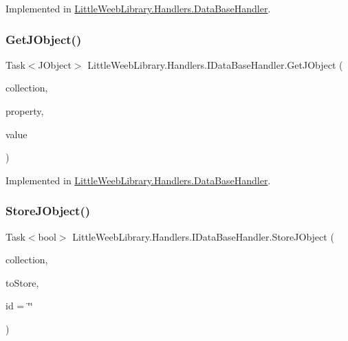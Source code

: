 Implemented in \mbox{\hyperlink{class_little_weeb_library_1_1_handlers_1_1_data_base_handler_a7f61583807f99b7838a33d2db0f7ca68}{Little\+Weeb\+Library.\+Handlers.\+Data\+Base\+Handler}}.

\mbox{\label{interface_little_weeb_library_1_1_handlers_1_1_i_data_base_handler_a9d9a8fc06ab8431daa5363becf79cf65}} 
\subsubsection{\texorpdfstring{Get\+J\+Object()}{GetJObject()}\hspace{0.1cm}{\footnotesize\ttfamily [2/2]}}
{\footnotesize\ttfamily Task$<$J\+Object$>$ Little\+Weeb\+Library.\+Handlers.\+I\+Data\+Base\+Handler.\+Get\+J\+Object (\begin{DoxyParamCaption}\item[{string}]{collection,  }\item[{string}]{property,  }\item[{string}]{value }\end{DoxyParamCaption})}



Implemented in \mbox{\hyperlink{class_little_weeb_library_1_1_handlers_1_1_data_base_handler_a4d7ed521cd4bedc0d650bc01afc67587}{Little\+Weeb\+Library.\+Handlers.\+Data\+Base\+Handler}}.

\mbox{\label{interface_little_weeb_library_1_1_handlers_1_1_i_data_base_handler_a5d87c42ef7dc7e5d86f7e6fada3454e9}} 
\subsubsection{\texorpdfstring{Store\+J\+Object()}{StoreJObject()}}
{\footnotesize\ttfamily Task$<$bool$>$ Little\+Weeb\+Library.\+Handlers.\+I\+Data\+Base\+Handler.\+Store\+J\+Object (\begin{DoxyParamCaption}\item[{string}]{collection,  }\item[{J\+Object}]{to\+Store,  }\item[{string}]{id = {\ttfamily \char`\"{}\char`\"{}} }\end{DoxyParamCaption})}



